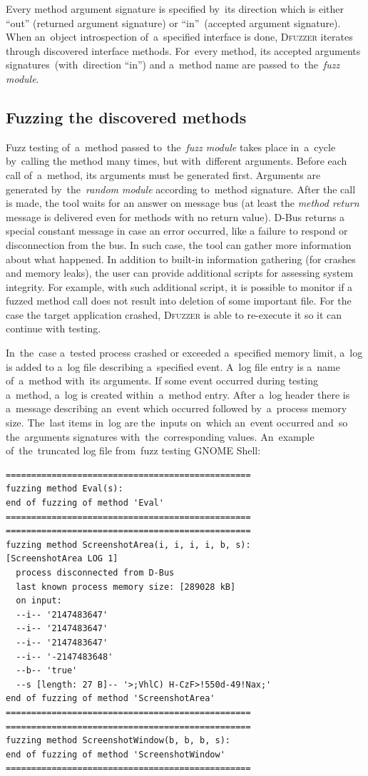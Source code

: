 \documentclass[conference]{IEEEtran}
\begin{document}
Every method argument signature is specified by~its
direction which is either ``out'' (returned argument signature) or
``in''~(accepted argument signature). When an~object introspection of~a~specified
interface is done, \textsc{Dfuzzer} iterates through discovered interface
methods. For~every method, its accepted arguments signatures~(with~direction
``in'') and a~method name are passed to~the~\emph{fuzz module}.

\subsection{Fuzzing the discovered methods} Fuzz testing of~a~method passed
to~the~\emph{fuzz module} takes place in~a~cycle by~calling the method many
times, but with~different arguments.  Before each call of~a~method, its
arguments must be generated first. Arguments are generated by~the~\emph{random
module} according to~method signature. After the call is made, the tool waits
for an answer on message bus (at least the \textit{method return} message is
delivered even for methods with no return value). D-Bus returns a special
constant message in case an error occurred, like a failure to respond or
disconnection from the bus. In such case, the tool can gather more information
about what happened. In addition to built-in information gathering (for crashes
and memory leaks), the user can provide additional scripts for assessing
system integrity. For example, with such additional script, it is possible to
monitor if a fuzzed method call does not result into deletion of some important
file. For the case the target application crashed, \textsc{Dfuzzer} is able to
re-execute it so it can continue with testing.


In~the~case a~tested process crashed or exceeded a~specified memory limit,
a~log is added to a~log file describing a~specified event. A~log file entry is
a~name of~a~method with~its arguments. If some event occurred during testing
a~method, a~log is created within~a~method entry. After a~log header there is
a~message describing an~event which occurred followed by~a~process memory size.
The~last items in~log are the~inputs on~which an~event occurred and~so
the~arguments signatures with~the~corresponding values. An~example
of~the~truncated log file from~fuzz testing GNOME Shell:


{
\footnotesize
\begin{verbatim}
================================================
fuzzing method Eval(s):
end of fuzzing of method 'Eval'
================================================
================================================
fuzzing method ScreenshotArea(i, i, i, i, b, s):
[ScreenshotArea LOG 1]
  process disconnected from D-Bus
  last known process memory size: [289028 kB]
  on input:
  --i-- '2147483647'
  --i-- '2147483647'
  --i-- '2147483647'
  --i-- '-2147483648'
  --b-- 'true'
  --s [length: 27 B]-- '>;VhlC) H-CzF>!550d-49!Nax;'
end of fuzzing of method 'ScreenshotArea'
================================================
================================================
fuzzing method ScreenshotWindow(b, b, b, s):
end of fuzzing of method 'ScreenshotWindow'
================================================
\end{verbatim}
}
\end{document}
